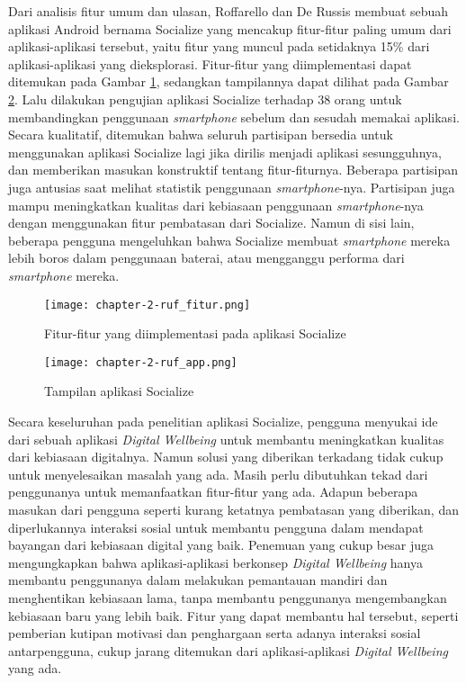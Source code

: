 Dari analisis fitur umum dan ulasan, Roffarello dan De Russis membuat sebuah aplikasi Android bernama Socialize yang mencakup fitur-fitur paling umum dari aplikasi-aplikasi tersebut, yaitu fitur yang muncul pada setidaknya 15\% dari aplikasi-aplikasi yang dieksplorasi. Fitur-fitur yang diimplementasi dapat ditemukan pada Gambar \ref{img:ruf_fitur}, sedangkan tampilannya dapat dilihat pada Gambar \ref{img:ruf_app}. Lalu dilakukan pengujian aplikasi Socialize terhadap 38 orang untuk membandingkan penggunaan \textit{smartphone} sebelum dan sesudah memakai aplikasi. Secara kualitatif, ditemukan bahwa seluruh partisipan bersedia untuk menggunakan aplikasi Socialize lagi jika dirilis menjadi aplikasi sesungguhnya, dan memberikan masukan konstruktif tentang fitur-fiturnya. Beberapa partisipan juga antusias saat melihat statistik penggunaan \textit{smartphone}-nya. Partisipan juga mampu meningkatkan kualitas dari kebiasaan penggunaan \textit{smartphone}-nya dengan menggunakan fitur pembatasan dari Socialize. Namun di sisi lain, beberapa pengguna mengeluhkan bahwa Socialize membuat \textit{smartphone} mereka lebih boros dalam penggunaan baterai, atau mengganggu performa dari \textit{smartphone} mereka.

\begin{figure}[h]
  \centering
  \texttt{[image: chapter-2-ruf\_fitur.png]}
  \caption{Fitur-fitur yang diimplementasi pada aplikasi Socialize \parencite{CHI2019SOCIALIZE}}
  \label{img:ruf_fitur}
\end{figure}

\begin{figure}[h]
  \centering
  \texttt{[image: chapter-2-ruf\_app.png]}
  \caption{Tampilan aplikasi Socialize \parencite{CHI2019SOCIALIZE}}
  \label{img:ruf_app}
\end{figure}

Secara keseluruhan pada penelitian aplikasi Socialize, pengguna menyukai ide dari sebuah aplikasi \textit{Digital Wellbeing} untuk membantu meningkatkan kualitas dari kebiasaan digitalnya. Namun solusi yang diberikan terkadang tidak cukup untuk menyelesaikan masalah yang ada. Masih perlu dibutuhkan tekad dari penggunanya untuk memanfaatkan fitur-fitur yang ada. Adapun beberapa masukan dari pengguna seperti kurang ketatnya pembatasan yang diberikan, dan diperlukannya interaksi sosial untuk membantu pengguna dalam mendapat bayangan dari kebiasaan digital yang baik. Penemuan yang cukup besar juga mengungkapkan bahwa aplikasi-aplikasi berkonsep \textit{Digital Wellbeing} hanya membantu penggunanya dalam melakukan pemantauan mandiri dan menghentikan kebiasaan lama, tanpa membantu penggunanya mengembangkan kebiasaan baru yang lebih baik. Fitur yang dapat membantu hal tersebut, seperti pemberian kutipan motivasi dan penghargaan serta adanya interaksi sosial antarpengguna, cukup jarang ditemukan dari aplikasi-aplikasi \textit{Digital Wellbeing} yang ada.